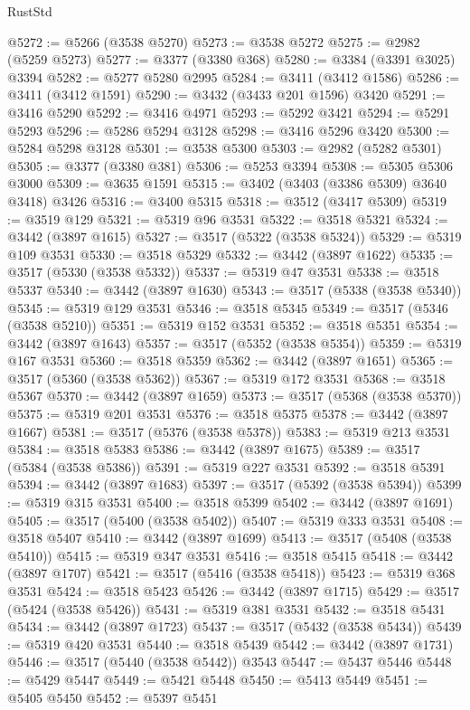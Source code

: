 \begin{lexlean}{RustStd}
\begin{coremodule}
@5272 := @5266 (@3538 @5270)
@5273 := @3538 @5272
@5275 := @2982 (@5259 @5273)
@5277 := @3377 (@3380 @368)
@5280 := @3384 (@3391 @3025) @3394
@5282 := @5277 @5280 @2995
@5284 := @3411 (@3412 @1586)
@5286 := @3411 (@3412 @1591)
@5290 := @3432 (@3433 @201 @1596) @3420
@5291 := @3416 @5290
@5292 := @3416 @4971
@5293 := @5292 @3421
@5294 := @5291 @5293
@5296 := @5286 @5294 @3128
@5298 := @3416 @5296 @3420
@5300 := @5284 @5298 @3128
@5301 := @3538 @5300
@5303 := @2982 (@5282 @5301)
@5305 := @3377 (@3380 @381)
@5306 := @5253 @3394
@5308 := @5305 @5306 @3000
@5309 := @3635 @1591
@5315 := @3402 (@3403 (@3386 @5309) @3640 @3418) @3426
@5316 := @3400 @5315
@5318 := @3512 (@3417 @5309)
@5319 := @3519 @129
@5321 := @5319 @96 @3531
@5322 := @3518 @5321
@5324 := @3442 (@3897 @1615)
@5327 := @3517 (@5322 (@3538 @5324))
@5329 := @5319 @109 @3531
@5330 := @3518 @5329
@5332 := @3442 (@3897 @1622)
@5335 := @3517 (@5330 (@3538 @5332))
@5337 := @5319 @47 @3531
@5338 := @3518 @5337
@5340 := @3442 (@3897 @1630)
@5343 := @3517 (@5338 (@3538 @5340))
@5345 := @5319 @129 @3531
@5346 := @3518 @5345
@5349 := @3517 (@5346 (@3538 @5210))
@5351 := @5319 @152 @3531
@5352 := @3518 @5351
@5354 := @3442 (@3897 @1643)
@5357 := @3517 (@5352 (@3538 @5354))
@5359 := @5319 @167 @3531
@5360 := @3518 @5359
@5362 := @3442 (@3897 @1651)
@5365 := @3517 (@5360 (@3538 @5362))
@5367 := @5319 @172 @3531
@5368 := @3518 @5367
@5370 := @3442 (@3897 @1659)
@5373 := @3517 (@5368 (@3538 @5370))
@5375 := @5319 @201 @3531
@5376 := @3518 @5375
@5378 := @3442 (@3897 @1667)
@5381 := @3517 (@5376 (@3538 @5378))
@5383 := @5319 @213 @3531
@5384 := @3518 @5383
@5386 := @3442 (@3897 @1675)
@5389 := @3517 (@5384 (@3538 @5386))
@5391 := @5319 @227 @3531
@5392 := @3518 @5391
@5394 := @3442 (@3897 @1683)
@5397 := @3517 (@5392 (@3538 @5394))
@5399 := @5319 @315 @3531
@5400 := @3518 @5399
@5402 := @3442 (@3897 @1691)
@5405 := @3517 (@5400 (@3538 @5402))
@5407 := @5319 @333 @3531
@5408 := @3518 @5407
@5410 := @3442 (@3897 @1699)
@5413 := @3517 (@5408 (@3538 @5410))
@5415 := @5319 @347 @3531
@5416 := @3518 @5415
@5418 := @3442 (@3897 @1707)
@5421 := @3517 (@5416 (@3538 @5418))
@5423 := @5319 @368 @3531
@5424 := @3518 @5423
@5426 := @3442 (@3897 @1715)
@5429 := @3517 (@5424 (@3538 @5426))
@5431 := @5319 @381 @3531
@5432 := @3518 @5431
@5434 := @3442 (@3897 @1723)
@5437 := @3517 (@5432 (@3538 @5434))
@5439 := @5319 @420 @3531
@5440 := @3518 @5439
@5442 := @3442 (@3897 @1731)
@5446 := @3517 (@5440 (@3538 @5442)) @3543
@5447 := @5437 @5446
@5448 := @5429 @5447
@5449 := @5421 @5448
@5450 := @5413 @5449
@5451 := @5405 @5450
@5452 := @5397 @5451

\end{coremodule}
\end{lexlean}
